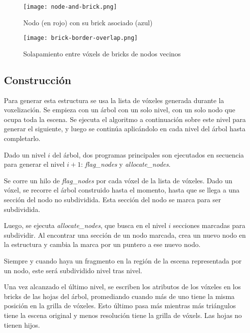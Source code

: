 \begin{figure}[h!]
    \centering
    \texttt{[image: node-and-brick.png]}
    \caption{Nodo (en rojo) con su brick asociado (azul)}
    \label{fig:node_and_brick}
\end{figure}

\begin{figure}[h!]
    \centering
    \texttt{[image: brick-border-overlap.png]}
    \caption{Solapamiento entre vóxels de bricks de nodos vecinos}
    \label{fig:brick_border_overlap}
\end{figure}

\subsection{Construcción}\label{design:svo_construction}

Para generar esta estructura se usa la lista de vóxeles generada durante la voxelización.
Se empieza con un árbol con un solo nivel, con un solo nodo que ocupa toda la escena.
Se ejecuta el algoritmo a continuación sobre este nivel para generar el siguiente, y luego se continúa aplicándolo en cada nivel del árbol hasta completarlo.


Dado un nivel $i$ del árbol, dos programas principales son ejecutados en secuencia para generar el nivel $i + 1$: \textit{flag\_nodes} y \textit{allocate\_nodes}.

Se corre un hilo de \textit{flag\_nodes} por cada vóxel de la lista de vóxeles.
Dado un vóxel, se recorre el árbol construido hasta el momento, hasta que se llega a una sección del nodo no subdividida.
Esta sección del nodo se marca para ser subdividida.

Luego, se ejecuta \textit{allocate\_nodes}, que busca en el nivel $i$ secciones marcadas para subdividir.
Al encontrar una sección de un nodo marcada, crea un nuevo nodo en la estructura y cambia la marca por un puntero a ese nuevo nodo.

Siempre y cuando haya un fragmento en la región de la escena representada por un nodo, este será subdividido nivel tras nivel.

Una vez alcanzado el último nivel, se escriben los atributos de los vóxeles en los bricks de las hojas del árbol, promediando cuando más de uno tiene la misma posición en la grilla de vóxeles.
Esto último pasa más mientras más triángulos tiene la escena original y menos resolución tiene la grilla de vóxels.
Las hojas no tienen hijos.


